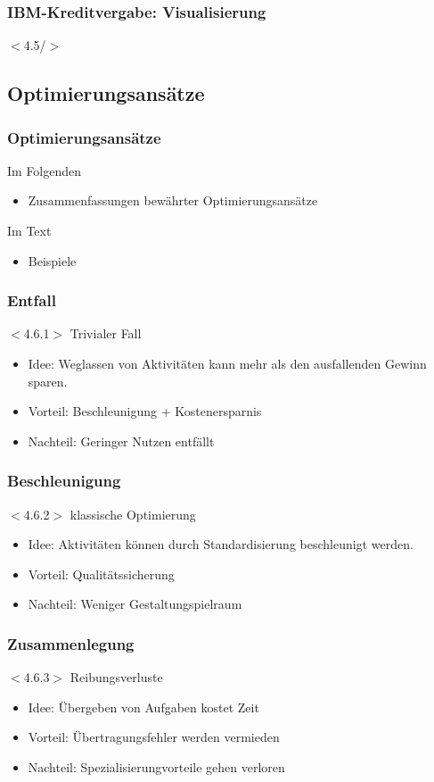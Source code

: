 \documentclass{beamer}
\begin{document}
 \begin{frame}
  \frametitle{IBM-Kreditvergabe: Visualisierung}
  $<$4.5/$>$
 \end{frame}

 \subsection{Optimierungsansätze}
 \begin{frame}
  \frametitle{Optimierungsansätze}
  Im Folgenden
  \begin{itemize}
    \item Zusammenfassungen bewährter Optimierungsansätze
  \end{itemize}
  Im Text
  \begin{itemize}
    \item Beispiele
  \end{itemize}
 \end{frame}

 \begin{frame}
  \frametitle{Entfall}
  $<$4.6.1$>$
  Trivialer Fall
  \begin{itemize}
    \item Idee: Weglassen von Aktivitäten kann mehr als den ausfallenden Gewinn sparen.
    \item Vorteil: Beschleunigung + Kostenersparnis
    \item Nachteil: Geringer Nutzen entfällt
  \end{itemize}
 \end{frame}

 \begin{frame}
  \frametitle{Beschleunigung}
  $<$4.6.2$>$
  klassische Optimierung
  \begin{itemize}
    \item Idee: Aktivitäten können durch Standardisierung beschleunigt werden.
    \item Vorteil: Qualitätssicherung
    \item Nachteil: Weniger Gestaltungspielraum
  \end{itemize}
 \end{frame}

 \begin{frame}
  \frametitle{Zusammenlegung}
  $<$4.6.3$>$
  Reibungsverluste
  \begin{itemize}
    \item Idee: Übergeben von Aufgaben kostet Zeit
    \item Vorteil: Übertragungsfehler werden vermieden
    \item Nachteil: Spezialisierungvorteile gehen verloren
  \end{itemize}
 \end{frame}
\end{document}
